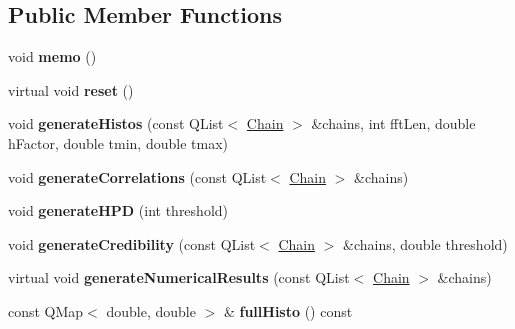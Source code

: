 \subsection*{Public Member Functions}
\begin{DoxyCompactItemize}
\item 
\hypertarget{class_metropolis_variable_ad99cd15a0e03a8b13c9dfe1dae595c27}{void {\bfseries memo} ()}\label{class_metropolis_variable_ad99cd15a0e03a8b13c9dfe1dae595c27}

\item 
\hypertarget{class_metropolis_variable_ad57919f0963729582deb1b707db62bf0}{virtual void {\bfseries reset} ()}\label{class_metropolis_variable_ad57919f0963729582deb1b707db62bf0}

\item 
\hypertarget{class_metropolis_variable_abef93531822e44e56459aeb7ee63f559}{void {\bfseries generate\-Histos} (const Q\-List$<$ \hyperlink{struct_chain}{Chain} $>$ \&chains, int fft\-Len, double h\-Factor, double tmin, double tmax)}\label{class_metropolis_variable_abef93531822e44e56459aeb7ee63f559}

\item 
\hypertarget{class_metropolis_variable_ac0516993e5af525a90a6bf3265214a37}{void {\bfseries generate\-Correlations} (const Q\-List$<$ \hyperlink{struct_chain}{Chain} $>$ \&chains)}\label{class_metropolis_variable_ac0516993e5af525a90a6bf3265214a37}

\item 
\hypertarget{class_metropolis_variable_ab316227a5d2d0ea85d497855bc9b97cf}{void {\bfseries generate\-H\-P\-D} (int threshold)}\label{class_metropolis_variable_ab316227a5d2d0ea85d497855bc9b97cf}

\item 
\hypertarget{class_metropolis_variable_a0578c1254af3b076a77df20149469ffb}{void {\bfseries generate\-Credibility} (const Q\-List$<$ \hyperlink{struct_chain}{Chain} $>$ \&chains, double threshold)}\label{class_metropolis_variable_a0578c1254af3b076a77df20149469ffb}

\item 
\hypertarget{class_metropolis_variable_a2ba70c0d9af69cdacb21950f280ce281}{virtual void {\bfseries generate\-Numerical\-Results} (const Q\-List$<$ \hyperlink{struct_chain}{Chain} $>$ \&chains)}\label{class_metropolis_variable_a2ba70c0d9af69cdacb21950f280ce281}

\item 
\hypertarget{class_metropolis_variable_a1d53657d0d732e9ff61a1e01a615151b}{const Q\-Map$<$ double, double $>$ \& {\bfseries full\-Histo} () const }\label{class_metropolis_variable_a1d53657d0d732e9ff61a1e01a615151b}


\end{DoxyCompactItemize}
